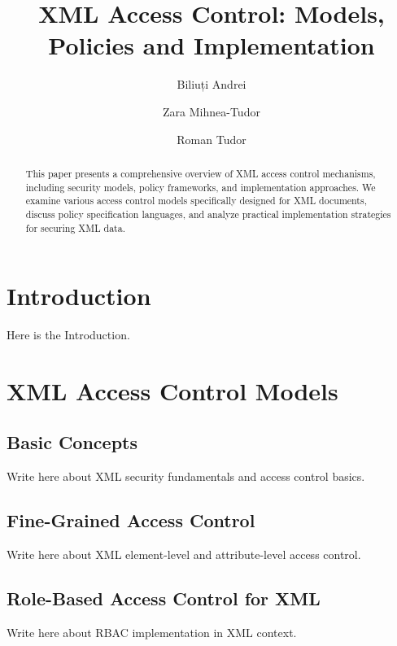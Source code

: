 \documentclass[runningheads]{llncs}
\begin{document}
\title{XML Access Control: Models, Policies and Implementation}
\author{Biliuți Andrei \and Zara Mihnea-Tudor \and Roman Tudor}
\maketitle

\begin{abstract}
This paper presents a comprehensive overview of XML access control mechanisms, including security models, policy frameworks, and implementation approaches. We examine various access control models specifically designed for XML documents, discuss policy specification languages, and analyze practical implementation strategies for securing XML data.
\end{abstract}

\section{Introduction}
Here is the Introduction.

\section{XML Access Control Models}

\subsection{Basic Concepts}
Write here about XML security fundamentals and access control basics.

\subsection{Fine-Grained Access Control}
Write here about XML element-level and attribute-level access control.

\subsection{Role-Based Access Control for XML}
Write here about RBAC implementation in XML context.
\end{document}
